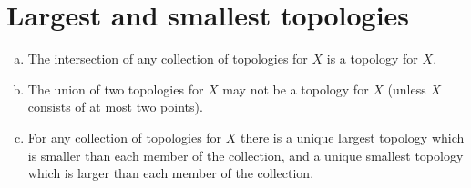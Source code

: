\section{Largest and smallest topologies}
\label{exercises:01-A}

\begin{enumerate}[(a)]
  \item
    The intersection of any collection of topologies for \(X\) is a topology for
    \(X\).
  \item
    The union of two topologies for \(X\) may not be a topology for \(X\)
    (unless \(X\) consists of at most two points).
  \item
    For any collection of topologies for \(X\) there is a unique largest
    topology which is smaller than each member of the collection, and a unique
    smallest topology which is larger than each member of the collection.
\end{enumerate}
